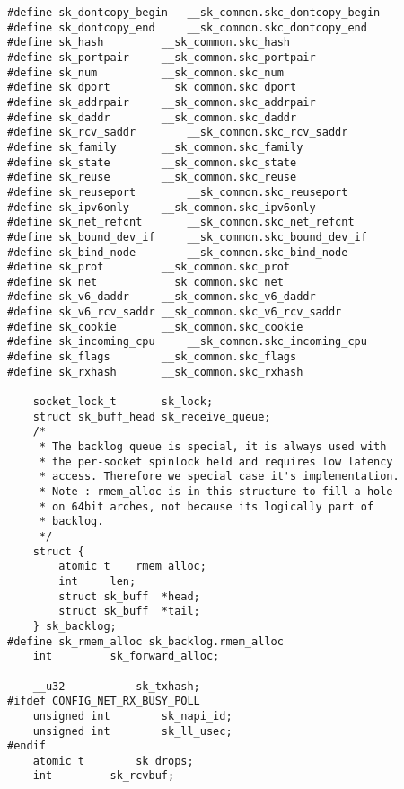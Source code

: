 \begin{verbatim}
#define sk_dontcopy_begin   __sk_common.skc_dontcopy_begin
#define sk_dontcopy_end     __sk_common.skc_dontcopy_end
#define sk_hash         __sk_common.skc_hash
#define sk_portpair     __sk_common.skc_portpair
#define sk_num          __sk_common.skc_num
#define sk_dport        __sk_common.skc_dport
#define sk_addrpair     __sk_common.skc_addrpair
#define sk_daddr        __sk_common.skc_daddr
#define sk_rcv_saddr        __sk_common.skc_rcv_saddr
#define sk_family       __sk_common.skc_family
#define sk_state        __sk_common.skc_state
#define sk_reuse        __sk_common.skc_reuse
#define sk_reuseport        __sk_common.skc_reuseport
#define sk_ipv6only     __sk_common.skc_ipv6only
#define sk_net_refcnt       __sk_common.skc_net_refcnt
#define sk_bound_dev_if     __sk_common.skc_bound_dev_if
#define sk_bind_node        __sk_common.skc_bind_node
#define sk_prot         __sk_common.skc_prot
#define sk_net          __sk_common.skc_net
#define sk_v6_daddr     __sk_common.skc_v6_daddr
#define sk_v6_rcv_saddr __sk_common.skc_v6_rcv_saddr
#define sk_cookie       __sk_common.skc_cookie
#define sk_incoming_cpu     __sk_common.skc_incoming_cpu
#define sk_flags        __sk_common.skc_flags
#define sk_rxhash       __sk_common.skc_rxhash

    socket_lock_t       sk_lock;
    struct sk_buff_head sk_receive_queue;
    /*
     * The backlog queue is special, it is always used with
     * the per-socket spinlock held and requires low latency
     * access. Therefore we special case it's implementation.
     * Note : rmem_alloc is in this structure to fill a hole
     * on 64bit arches, not because its logically part of
     * backlog.
     */
    struct {
        atomic_t    rmem_alloc;
        int     len;
        struct sk_buff  *head;
        struct sk_buff  *tail;
    } sk_backlog;
#define sk_rmem_alloc sk_backlog.rmem_alloc
    int         sk_forward_alloc;

    __u32           sk_txhash;
#ifdef CONFIG_NET_RX_BUSY_POLL
    unsigned int        sk_napi_id;
    unsigned int        sk_ll_usec;
#endif
    atomic_t        sk_drops;
    int         sk_rcvbuf;


\end{verbatim}
